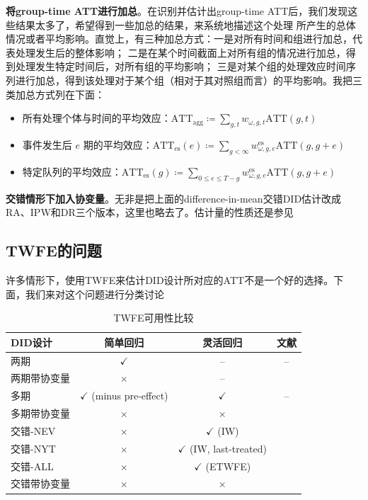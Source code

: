 \documentclass[../didNotes.tex]{subfiles}
\begin{document}
\textbf{将group-time ATT进行加总}。在识别并估计出group-time ATT后，我们发现这些结果太多了，希望得到一些加总的结果，来系统地描述这个处理
所产生的总体情况或者平均影响。直觉上，有三种加总方式：一是对所有时间和组进行加总，代表处理发生后的整体影响；
二是在某个时间截面上对所有组的情况进行加总，得到处理发生特定时间后，对所有组的平均影响；
三是对某个组的处理效应时间序列进行加总，得到该处理对于某个组（相对于其对照组而言）的平均影响。我把三类加总方式列在下面：
\begin{itemize}
  \item 所有处理个体与时间的平均效应：\( \text{ATT}_{\text{agg}}
    \coloneqq \sum_{g,t} w_{\omega, g,t} \text{ATT}(g,t) \)
  \item 事件发生后 \( e \) 期的平均效应：\(
      \text{ATT}_{\text{es}}(e) \coloneqq \sum_{g < \infty} w^{\text{es}}_{\omega, g, e}
    \text{ATT}(g,g+e)  \)
  \item 特定队列的平均效应：\( \text{ATT}_{\text{es}}(g) \coloneqq
    \sum_{0 \le e \le T-g} w^{\text{es}}_{\omega, g, e} \text{ATT}(g,g+e)  \)
\end{itemize}

\textbf{交错情形下加入协变量}。无非是把上面的difference-in-mean交错DID估计改成RA、IPW和DR三个版本，这里也略去了。估计量的性质还是参见
\textcite{SantAnna.Zhao2020, callaway2021}

\subsection{TWFE的问题}

许多情形下，使用TWFE来估计DID设计所对应的ATT不是一个好的选择。下面，我们来对这个问题进行分类讨论

\begin{table}[ht]
  \caption{TWFE可用性比较}\label{tab:TWFE}
  \centering
  \begin{adjustbox}{width = \textwidth, center}
    \begin{tabular}{@{} l*{3}{c} @{}}
      \toprule
      DID设计    & 简单回归       & 灵活回归   & 文献    \\
      \hline
      两期    & $\checkmark$     & --   & --  \\
      两期带协变量    & $\times$     & --  & \textcite{SantAnna.Zhao2020}   \\
      多期    & $\checkmark$ (minus pre-effect)     & $\checkmark$ & --    \\
      多期带协变量    & $\times$     & $\times$  & \textcite{callaway2021}   \\
      交错-NEV    & $\times$   & $\checkmark$ (IW) & \textcite{sun2021}    \\
      交错-NYT    & $\times$    & $\checkmark$ (IW, last-treated) & \textcite{sun2021}    \\
      交错-ALL    & $\times$    & $\checkmark$ (ETWFE) & \textcite{wooldridge2021}   \\
      交错带协变量    & $\times$    & $\times$ & \textcite{callaway2021} \\
      \bottomrule
    \end{tabular}
  \end{adjustbox}
\end{table}
\end{document}
